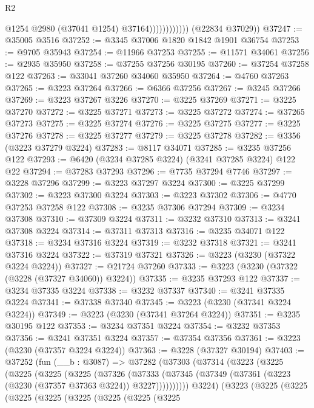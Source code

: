 \begin{lexlean}{R2}
\begin{coremodule}
                              @1254
                              @2980
                              (@37041 @1254)
                              @37164))))))))))))
      (@22834 @37029))
@37247 := @35005 @3516
@37252 := @3345 @37006 @1820 @1842 @1901 @36754
@37253 := @9705 @35943
@37254 := @11966 @37253
@37255 := @11571 @34061
@37256 := @2935 @35950
@37258 := @37255 @37256 @30195
@37260 := @37254 @37258 @122
@37263 := @33041 @37260 @34060 @35950
@37264 := @4760 @37263
@37265 := @3223 @37264
@37266 := @6366 @37256
@37267 := @3245 @37266
@37269 := @3223 @37267 @3226
@37270 := @3225 @37269
@37271 := @3225 @37270
@37272 := @3225 @37271
@37273 := @3225 @37272
@37274 := @37265 @37273
@37275 := @3225 @37274
@37276 := @3225 @37275
@37277 := @3225 @37276
@37278 := @3225 @37277
@37279 := @3225 @37278
@37282 := @3356 (@3223 @37279 @3224)
@37283 := @8117 @34071
@37285 := @3235 @37256 @122
@37293 := @6420 (@3234 @37285 @3224) (@3241 @37285 @3224) @122 @22
@37294 := @37283 @37293
@37296 := @7735 @37294 @7746
@37297 := @3228 @37296
@37299 := @3223 @37297 @3224
@37300 := @3225 @37299
@37302 := @3223 @37300 @3224
@37303 := @3223 @37302
@37306 := @4770 @37253 @37258 @122
@37308 := @3235 @37306 @37294
@37309 := @3234 @37308
@37310 := @37309 @3224
@37311 := @3232 @37310
@37313 := @3241 @37308 @3224
@37314 := @37311 @37313
@37316 := @3235 @34071 @122
@37318 := @3234 @37316 @3224
@37319 := @3232 @37318
@37321 := @3241 @37316 @3224
@37322 := @37319 @37321
@37326 := @3223 (@3230 (@37322 @3224 @3224))
@37327 := @21724 @37260
@37333 := @3223 (@3230 (@37322 (@3228 (@37327 @34060)) @3224))
@37335 := @3235 @37293 @122
@37337 := @3234 @37335 @3224
@37338 := @3232 @37337
@37340 := @3241 @37335 @3224
@37341 := @37338 @37340
@37345 := @3223 (@3230 (@37341 @3224 @3224))
@37349 := @3223 (@3230 (@37341 @37264 @3224))
@37351 := @3235 @30195 @122
@37353 := @3234 @37351 @3224
@37354 := @3232 @37353
@37356 := @3241 @37351 @3224
@37357 := @37354 @37356
@37361 := @3223 (@3230 (@37357 @3224 @3224))
@37363 := @3228 (@37327 @30194)
@37403 := @37252
    (fun (__b : @3087) =>
    @37282
      (@37303
        (@37314
          (@3223
            (@3225
              (@3225
                (@3225
                  (@3225
                    (@37326
                      (@37333
                        (@37345 (@37349 (@37361 (@3223 (@3230 (@37357 @37363 @3224)) @3227))))))))))
            @3224)
          (@3223
            (@3225
              (@3225
                (@3225
                  (@3225
                    (@3225
                      (@3225
                        (@3225
                          (@3225

\end{coremodule}
\end{lexlean}
